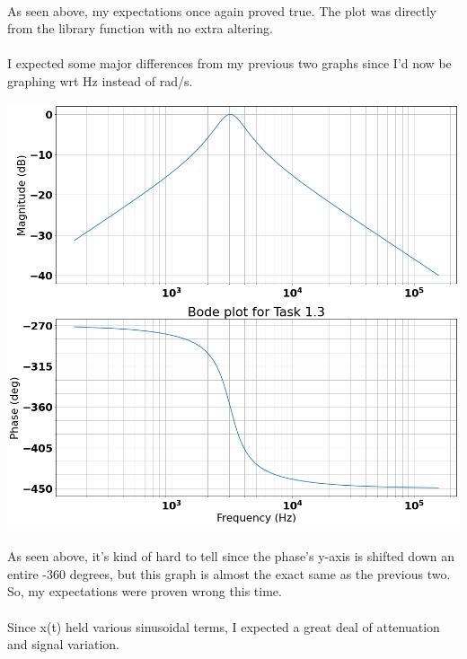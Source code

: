 \documentclass[12pt]{report}
\begin{document}
    \paragraph{} As seen above, my expectations once again proved true. The plot was directly from the library function with no extra altering. 

    \paragraph{} I expected some major differences from my previous two graphs since I'd now be graphing wrt Hz instead of rad/s.    
    
    \includegraphics[scale=0.25]{Figure 2022-03-29 221910 (2).png}
    
    \paragraph{} As seen above, it's kind of hard to tell since the phase's y-axis is shifted down an entire -360 degrees, but this graph is almost the exact same as the previous two. So, my expectations were proven wrong this time. 

    \paragraph{} Since x(t) held various sinusoidal terms, I expected a great deal of attenuation and signal variation.    
    
\end{document}
